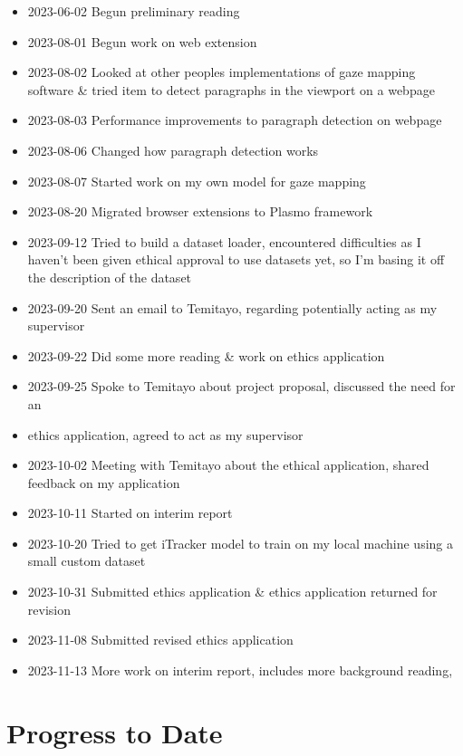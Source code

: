 \documentclass[twocolumn]{report}
\begin{document}
\begin{itemize}
    \item 2023-06-02 Begun preliminary reading 
    \item 2023-08-01 Begun work on web extension 
    \item 2023-08-02 Looked at other peoples implementations of gaze mapping software \& tried item to detect paragraphs in the viewport on a webpage 
    \item 2023-08-03 Performance improvements to paragraph detection on webpage 
    \item 2023-08-06 Changed how paragraph detection works 
    \item 2023-08-07 Started work on my own model for gaze mapping 
    \item 2023-08-20 Migrated browser extensions to Plasmo framework 
    \item 2023-09-12 Tried to build a dataset loader, encountered difficulties as I haven't been given ethical approval to use datasets yet, so I'm basing it off the description of the dataset
    \item 2023-09-20 Sent an email to Temitayo, regarding potentially acting as my supervisor
    \item 2023-09-22 Did some more reading \& work on ethics application  
    \item 2023-09-25 Spoke to Temitayo about project proposal, discussed the need for an
    \item ethics application, agreed to act as my supervisor 
    \item 2023-10-02 Meeting with Temitayo about the ethical application, shared feedback on my application 
    \item 2023-10-11 Started on interim report 
    \item 2023-10-20 Tried to get iTracker model to train on my local machine using a small custom dataset 
    \item 2023-10-31 Submitted ethics application \& ethics application returned for revision
    \item 2023-11-08 Submitted revised ethics application 
    \item 2023-11-13 More work on interim report, includes more background reading, 
\end{itemize}

\section{Progress to Date}
\end{document}
